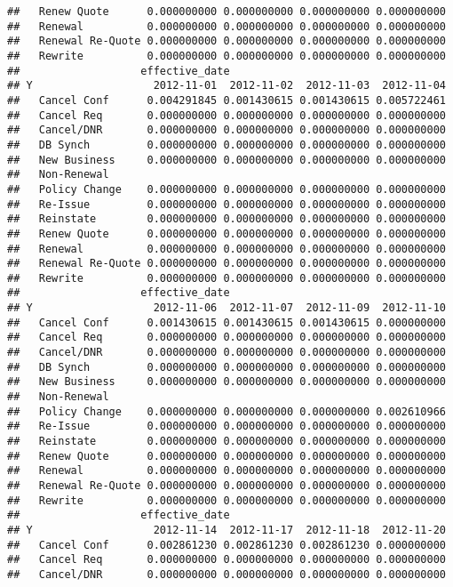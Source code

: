 \documentclass[]{article}
\begin{document}
\begin{verbatim}
##   Renew Quote      0.000000000 0.000000000 0.000000000 0.000000000
##   Renewal          0.000000000 0.000000000 0.000000000 0.000000000
##   Renewal Re-Quote 0.000000000 0.000000000 0.000000000 0.000000000
##   Rewrite          0.000000000 0.000000000 0.000000000 0.000000000
##                   effective_date
## Y                   2012-11-01  2012-11-02  2012-11-03  2012-11-04
##   Cancel Conf      0.004291845 0.001430615 0.001430615 0.005722461
##   Cancel Req       0.000000000 0.000000000 0.000000000 0.000000000
##   Cancel/DNR       0.000000000 0.000000000 0.000000000 0.000000000
##   DB Synch         0.000000000 0.000000000 0.000000000 0.000000000
##   New Business     0.000000000 0.000000000 0.000000000 0.000000000
##   Non-Renewal                                                     
##   Policy Change    0.000000000 0.000000000 0.000000000 0.000000000
##   Re-Issue         0.000000000 0.000000000 0.000000000 0.000000000
##   Reinstate        0.000000000 0.000000000 0.000000000 0.000000000
##   Renew Quote      0.000000000 0.000000000 0.000000000 0.000000000
##   Renewal          0.000000000 0.000000000 0.000000000 0.000000000
##   Renewal Re-Quote 0.000000000 0.000000000 0.000000000 0.000000000
##   Rewrite          0.000000000 0.000000000 0.000000000 0.000000000
##                   effective_date
## Y                   2012-11-06  2012-11-07  2012-11-09  2012-11-10
##   Cancel Conf      0.001430615 0.001430615 0.001430615 0.000000000
##   Cancel Req       0.000000000 0.000000000 0.000000000 0.000000000
##   Cancel/DNR       0.000000000 0.000000000 0.000000000 0.000000000
##   DB Synch         0.000000000 0.000000000 0.000000000 0.000000000
##   New Business     0.000000000 0.000000000 0.000000000 0.000000000
##   Non-Renewal                                                     
##   Policy Change    0.000000000 0.000000000 0.000000000 0.002610966
##   Re-Issue         0.000000000 0.000000000 0.000000000 0.000000000
##   Reinstate        0.000000000 0.000000000 0.000000000 0.000000000
##   Renew Quote      0.000000000 0.000000000 0.000000000 0.000000000
##   Renewal          0.000000000 0.000000000 0.000000000 0.000000000
##   Renewal Re-Quote 0.000000000 0.000000000 0.000000000 0.000000000
##   Rewrite          0.000000000 0.000000000 0.000000000 0.000000000
##                   effective_date
## Y                   2012-11-14  2012-11-17  2012-11-18  2012-11-20
##   Cancel Conf      0.002861230 0.002861230 0.002861230 0.000000000
##   Cancel Req       0.000000000 0.000000000 0.000000000 0.000000000
##   Cancel/DNR       0.000000000 0.000000000 0.000000000 0.000000000

\end{verbatim}
\end{document}
